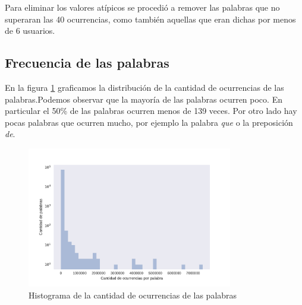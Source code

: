 Para eliminar los valores atípicos se procedió a remover las palabras que no superaran las 40 ocurrencias, como también aquellas que eran dichas por menos de 6 usuarios. 

\subsection{Frecuencia de las palabras}
\label{sub: frecuenciaPalabras}
En la figura \ref{fig:cantPalabras} graficamos la distribución de la cantidad de ocurrencias de las palabras.Podemos observar que la mayoría de las palabras ocurren poco. En particular el 50\% de las palabras ocurren menos de 139 veces. Por otro lado hay pocas palabras que ocurren mucho, por ejemplo la palabra \textit{que} o la preposición \textit{de}.

\begin{figure}[ht]
\centering
\includegraphics[width=0.8\textwidth]{./images/DistribucionOcurrenciasPalabras.pdf} 
\caption{Histograma de la cantidad de ocurrencias de las palabras} 
\label{fig:cantPalabras} 
\end{figure}

